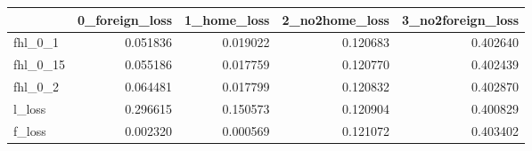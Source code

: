 \begin{tabular}{lrrrr}
\toprule
 & 0_foreign_loss & 1_home_loss & 2_no2home_loss & 3_no2foreign_loss \\
\midrule
fhl_0_1 & 0.051836 & 0.019022 & 0.120683 & 0.402640 \\
fhl_0_15 & 0.055186 & 0.017759 & 0.120770 & 0.402439 \\
fhl_0_2 & 0.064481 & 0.017799 & 0.120832 & 0.402870 \\
l_loss & 0.296615 & 0.150573 & 0.120904 & 0.400829 \\
f_loss & 0.002320 & 0.000569 & 0.121072 & 0.403402 \\
\bottomrule
\end{tabular}
